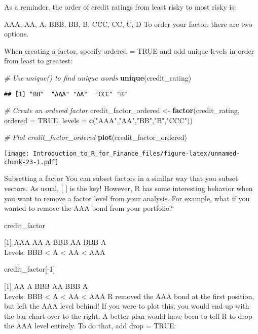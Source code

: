 \documentclass[]{article}
\newenvironment{Shaded}{\begin{snugshade}}{\end{snugshade}}
\newcommand{\KeywordTok}[1]{\textcolor[rgb]{0.13,0.29,0.53}{\textbf{#1}}}
\newcommand{\DataTypeTok}[1]{\textcolor[rgb]{0.13,0.29,0.53}{#1}}
\newcommand{\StringTok}[1]{\textcolor[rgb]{0.31,0.60,0.02}{#1}}
\newcommand{\CommentTok}[1]{\textcolor[rgb]{0.56,0.35,0.01}{\textit{#1}}}
\newcommand{\OtherTok}[1]{\textcolor[rgb]{0.56,0.35,0.01}{#1}}
\newcommand{\NormalTok}[1]{#1}
\begin{document}
As a reminder, the order of credit ratings from least risky to most
risky is:

AAA, AA, A, BBB, BB, B, CCC, CC, C, D To order your factor, there are
two options.

When creating a factor, specify ordered = TRUE and add unique levels in
order from least to greatest:

\begin{Shaded}
\begin{Highlighting}[]
\CommentTok{# Use unique() to find unique words}
\KeywordTok{unique}\NormalTok{(credit_rating)}
\end{Highlighting}
\end{Shaded}

\begin{verbatim}
## [1] "BB"  "AAA" "AA"  "CCC" "B"
\end{verbatim}

\begin{Shaded}
\begin{Highlighting}[]
\CommentTok{# Create an ordered factor}
\NormalTok{credit_factor_ordered <-}\StringTok{ }\KeywordTok{factor}\NormalTok{(credit_rating, }\DataTypeTok{ordered =} \OtherTok{TRUE}\NormalTok{, }\DataTypeTok{levels =} \KeywordTok{c}\NormalTok{(}\StringTok{"AAA"}\NormalTok{,}\StringTok{"AA"}\NormalTok{,}\StringTok{"BB"}\NormalTok{,}\StringTok{"B"}\NormalTok{,}\StringTok{"CCC"}\NormalTok{))}

\CommentTok{# Plot credit_factor_ordered}
\KeywordTok{plot}\NormalTok{(credit_factor_ordered)}
\end{Highlighting}
\end{Shaded}

\texttt{[image: Introduction\_to\_R\_for\_Finance\_files/figure-latex/unnamed-chunk-23-1.pdf]}

Subsetting a factor You can subset factors in a similar way that you
subset vectors. As usual, {[} {]} is the key! However, R has some
interesting behavior when you want to remove a factor level from your
analysis. For example, what if you wanted to remove the AAA bond from
your portfolio?

credit\_factor

{[}1{]} AAA AA A BBB AA BBB A\\
Levels: BBB \textless{} A \textless{} AA \textless{} AAA

credit\_factor{[}-1{]}

{[}1{]} AA A BBB AA BBB A\\
Levels: BBB \textless{} A \textless{} AA \textless{} AAA R removed the
AAA bond at the first position, but left the AAA level behind! If you
were to plot this, you would end up with the bar chart over to the
right. A better plan would have been to tell R to drop the AAA level
entirely. To do that, add drop = TRUE:
\end{document}
